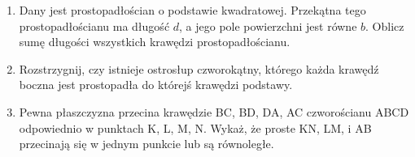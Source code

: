\documentclass[10pt]{article}
\begin{document}
\begin{enumerate}
  \item Dany jest prostopadłościan o podstawie kwadratowej. Przekątna tego prostopadłościanu ma długość \(d\), a jego pole powierzchni jest równe \(b\). Oblicz sumę długości wszystkich krawędzi prostopadłościanu.
  \item Rozstrzygnij, czy istnieje ostrosłup czworokątny, którego każda krawędź boczna jest prostopadła do którejś krawędzi podstawy.
  \item Pewna płaszczyzna przecina krawędzie BC, BD, DA, AC czworościanu ABCD odpowiednio w punktach K, L, M, N. Wykaż, że proste KN, LM, i AB przecinają się w jednym punkcie lub są równoległe.
\end{enumerate}
\end{document}

